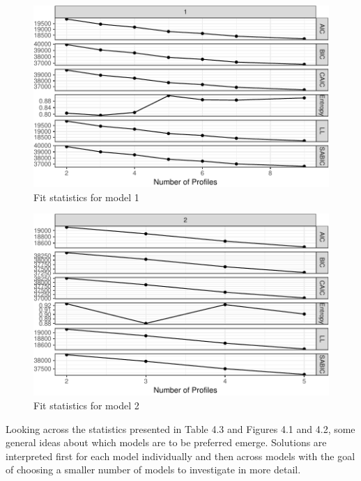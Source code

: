 \documentclass[]{book}
\theoremstyle{definition}
\theoremstyle{definition}
\theoremstyle{definition}
\theoremstyle{remark}
\begin{document}
\begin{figure}

{\centering \includegraphics[width=0.6\linewidth]{rosenberg-dissertation_files/figure-latex/model1-1} 

}

\caption{Fit statistics for model 1}\label{fig:model1}
\end{figure}

\begin{figure}

{\centering \includegraphics[width=0.5\linewidth]{rosenberg-dissertation_files/figure-latex/model2-1} 

}

\caption{Fit statistics for model 2}\label{fig:model2}
\end{figure}

Looking across the statistics presented in Table 4.3 and Figures 4.1 and
4.2, some general ideas about which models are to be preferred emerge.
Solutions are interpreted first for each model individually and then
across models with the goal of choosing a smaller number of models to
investigate in more detail.
\end{document}

